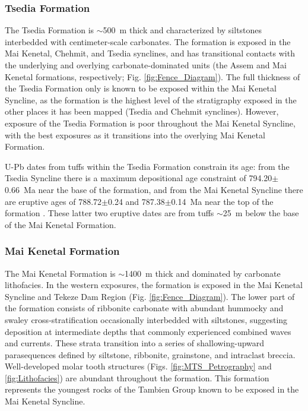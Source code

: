 \documentclass[11pt,letterpaper]{article}
\begin{document}
\subsubsection*{Tsedia Formation}

The Tsedia Formation is $\sim$500~m thick and characterized by siltstones interbedded with centimeter-scale carbonates. The formation is exposed in the Mai Kenetal, Chehmit, and Tsedia synclines, and has transitional contacts with the underlying and overlying carbonate-dominated units (the Assem and Mai Kenetal formations, respectively; Fig. \ref{fig:Fence_Diagram}). The full thickness of the Tsedia Formation only is known to be exposed within the Mai Kenetal Syncline, as the formation is the highest level of the stratigraphy exposed in the other places it has been mapped (Tsedia and Chehmit synclines). However, exposure of the Tsedia Formation is poor throughout the Mai Kenetal Syncline, with the best exposures as it transitions into the overlying Mai Kenetal Formation.

U-Pb dates from tuffs within the Tsedia Formation constrain its age: from the Tsedia Syncline there is a maximum depositional age constraint of 794.20$\pm$0.66~Ma near the base of the formation, and from the Mai Kenetal Syncline there are eruptive ages of 788.72$\pm$0.24 and 787.38$\pm$0.14~Ma near the top of the formation \citep{Swanson-Hysell2015a}. These latter two eruptive dates are from tuffs $\sim$25~m below the base of the Mai Kenetal Formation.

\subsubsection*{Mai Kenetal Formation}

The Mai Kenetal Formation is $\sim$1400~m thick and dominated by carbonate lithofacies. In the western exposures, the formation is exposed in the Mai Kenetal Syncline and Tekeze Dam Region (Fig. \ref{fig:Fence_Diagram}). The lower part of the formation consists of ribbonite carbonate with abundant hummocky and swaley cross-stratification occasionally interbedded with siltstones, suggesting deposition at intermediate depths that commonly experienced combined waves and currents. These strata transition into a series of shallowing-upward parasequences defined by siltstone, ribbonite, grainstone, and intraclast breccia. Well-developed molar tooth structures (Figs. \ref{fig:MTS_Petrography} and \ref{fig:Lithofacies}) are abundant throughout the formation. This formation represents the youngest rocks of the Tambien Group known to be exposed in the Mai Kenetal Syncline.
\end{document}
